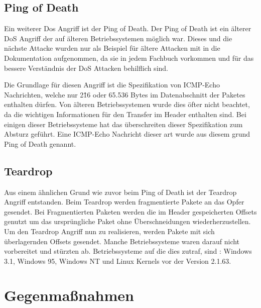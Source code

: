 \subsection{Ping of Death}

Ein weiterer Dos Angriff ist der Ping of Death. Der Ping of Death ist ein älterer DoS Angriff der auf älteren Betriebssystemen möglich war. Dieses und die nächste Attacke wurden nur als Beispiel für ältere Attacken mit in die Dokumentation aufgenommen, da sie in jedem Fachbuch vorkommen und für das bessere Verständnis der DoS Attacken behilflich sind.

Die Grundlage für diesen Angriff ist die Spezifikation von ICMP-Echo Nachrichten, welche nur 2\^16 oder 65.536 Bytes im Datenabschnitt der Paketes enthalten  dürfen. Von älteren Betriebssystemen wurde dies öfter nicht beachtet, da die wichtigen Informationen für den Transfer im Header enthalten sind. Bei einigen dieser Betriebssysteme hat das überschreiten dieser Spezifikation zum Absturz geführt. Eine ICMP-Echo Nachricht dieser art wurde aus diesem grund Ping of Death genannt. 

\subsection{Teardrop}

Aus einem ähnlichen Grund wie zuvor beim Ping of Death ist der Teardrop Angriff entstanden. Beim Teardrop werden fragmentierte Pakete an das Opfer gesendet. Bei Fragmentierten Paketen werden die im Header gespeicherten Offsets genutzt um das ursprüngliche Paket ohne Überschneidungen wiederherzustellen. 
Um den Teardrop Angriff nun zu realisieren, werden Pakete mit sich überlagernden Offsets gesendet. Manche Betriebssysteme waren darauf nicht vorbereitet und stürzten ab. 
Betriebssysteme auf die dies zutraf, sind : Windows 3.1, Windows 95, Windows NT und Linux Kernels vor der Version 2.1.63. 

\section{Gegenmaßnahmen}

